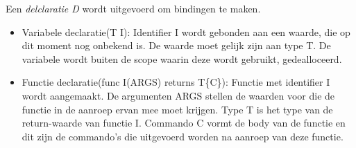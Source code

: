 Een \emph{delclaratie D} wordt uitgevoerd om bindingen te maken. 
\begin{itemize}
    \item Variabele declaratie(T I): Identifier I wordt gebonden aan een waarde, die op dit moment nog onbekend is. De waarde moet gelijk zijn aan type T. De variabele wordt buiten de scope waarin deze wordt gebruikt, gedealloceerd.
    \item Functie declaratie(func I(ARGS) returns T\{C\}): Functie met identifier I wordt aangemaakt. De argumenten ARGS stellen de waarden voor die de functie in de aanroep ervan mee moet krijgen. Type T is het type van de return-waarde van functie I. Commando C vormt de body van de functie en dit zijn de commando's die uitgevoerd worden na aanroep van deze functie.
\end{itemize}


\clearpage
